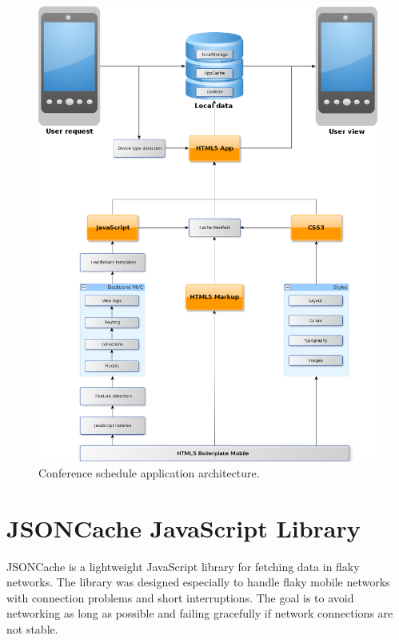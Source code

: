 \begin{figure}[ht]
  \begin{center}
    \includegraphics[width=\textwidth]{images/devdays.png}
    \caption{Conference schedule application architecture.}
    \label{figure:devdays.png}
  \end{center}
\end{figure}

\section{JSONCache JavaScript Library}
\label{section:jsoncache}

JSONCache is a lightweight JavaScript library for fetching 
data in flaky networks. The library was designed especially to handle
flaky mobile networks with connection problems and short
interruptions. The goal is to avoid networking as long as possible and
failing gracefully if network connections are not stable.

